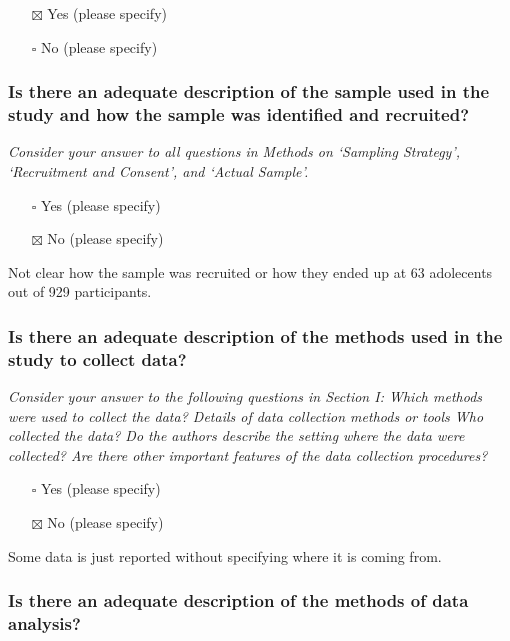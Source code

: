 \documentclass[
  doc, a4paper]{apa7}
\providecommand{\tightlist}{%
  \setlength{\itemsep}{0pt}\setlength{\parskip}{0pt}}
\begin{document}
\begin{itemize}
\tightlist
\item[$\boxtimes$]
  Yes (please specify)
\item[$\square$]
  No (please specify)
\end{itemize}

\subsubsection{Is there an adequate description of the sample used in the study and how the sample was identified and recruited?}\label{is-there-an-adequate-description-of-the-sample-used-in-the-study-and-how-the-sample-was-identified-and-recruited}

\emph{Consider your answer to all questions in Methods on `Sampling Strategy', `Recruitment and Consent', and `Actual Sample'.}

\begin{itemize}
\tightlist
\item[$\square$]
  Yes (please specify)
\item[$\boxtimes$]
  No (please specify)
\end{itemize}

Not clear how the sample was recruited or how they ended up at 63 adolecents out of 929 participants.

\subsubsection{Is there an adequate description of the methods used in the study to collect data?}\label{is-there-an-adequate-description-of-the-methods-used-in-the-study-to-collect-data}

\emph{Consider your answer to the following questions in Section I: Which methods were used to collect the data? Details of data collection methods or tools Who collected the data? Do the authors describe the setting where the data were collected? Are there other important features of the data collection procedures?}

\begin{itemize}
\tightlist
\item[$\square$]
  Yes (please specify)
\item[$\boxtimes$]
  No (please specify)
\end{itemize}

Some data is just reported without specifying where it is coming from.

\subsubsection{Is there an adequate description of the methods of data analysis?}\label{is-there-an-adequate-description-of-the-methods-of-data-analysis}
\end{document}
